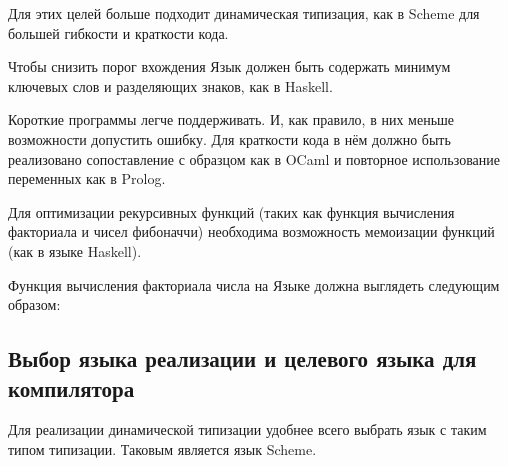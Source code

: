        Для этих целей больше подходит динамическая типизация, как в Scheme для большей гибкости и краткости кода.

        Чтобы снизить порог вхождения Язык должен быть содержать минимум ключевых слов и разделяющих знаков, как в Haskell.

        Короткие программы легче поддерживать.
        И, как правило, в них меньше возможности допустить ошибку.
        Для краткости кода в нём должно быть реализовано сопоставление с образцом как в OCaml и повторное использование переменных как в Prolog.

        Для оптимизации рекурсивных функций (таких как функция вычисления факториала и чисел фибоначчи) необходима возможность мемоизации функций (как в языке Haskell).

        Функция вычисления факториала числа на Языке должна выглядеть следующим образом:

        

    \subsection{Выбор языка реализации и целевого языка для компилятора}
        Для реализации динамической типизации удобнее всего выбрать язык с таким типом типизации.
        Таковым является язык Scheme.
